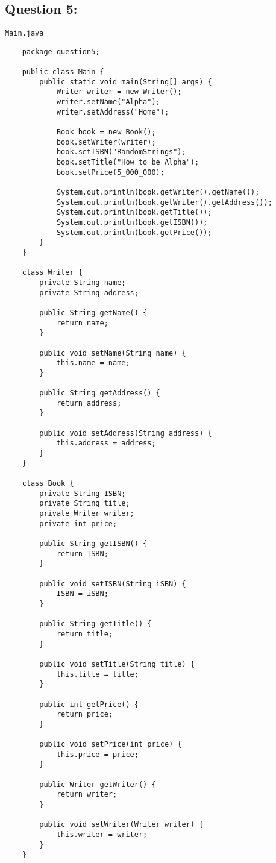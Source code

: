 \documentclass[12pt,titlepage]{article}
\begin{document}
\subsection*{Question 5:}
\noindent
\texttt{Main.java}
\begin{verbatim}
    package question5;

    public class Main {
        public static void main(String[] args) {
            Writer writer = new Writer();
            writer.setName("Alpha");
            writer.setAddress("Home");

            Book book = new Book();
            book.setWriter(writer);
            book.setISBN("RandomStrings");
            book.setTitle("How to be Alpha");
            book.setPrice(5_000_000);

            System.out.println(book.getWriter().getName());
            System.out.println(book.getWriter().getAddress());
            System.out.println(book.getTitle());
            System.out.println(book.getISBN());
            System.out.println(book.getPrice());
        }
    }

    class Writer {
        private String name;
        private String address;

        public String getName() {
            return name;
        }

        public void setName(String name) {
            this.name = name;
        }

        public String getAddress() {
            return address;
        }

        public void setAddress(String address) {
            this.address = address;
        }
    }

    class Book {
        private String ISBN;
        private String title;
        private Writer writer;
        private int price;

        public String getISBN() {
            return ISBN;
        }

        public void setISBN(String iSBN) {
            ISBN = iSBN;
        }

        public String getTitle() {
            return title;
        }

        public void setTitle(String title) {
            this.title = title;
        }

        public int getPrice() {
            return price;
        }

        public void setPrice(int price) {
            this.price = price;
        }

        public Writer getWriter() {
            return writer;
        }

        public void setWriter(Writer writer) {
            this.writer = writer;
        }
    }
\end{verbatim}
\end{document}
